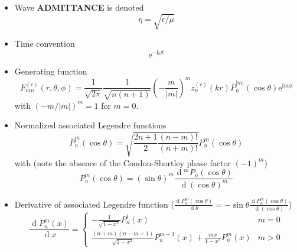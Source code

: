 \documentclass[a4paper,12pt]{article}
\newcommand{\mrm}[1]{\mathrm{#1}}
\newcommand{\diff}{\operatorname{d}\!}
\newcommand{\iu}{\mrm{i}}
\newcommand{\eu}{\mrm{e}}
\begin{document}
\begin{itemize}
\item Wave \textbf{ADMITTANCE} is denoted
  \begin{equation}
    \eta = \sqrt{\epsilon/\mu}
  \end{equation}
\item Time convention
  \begin{equation}
    \eu^{-\iu\omega t}
  \end{equation}
\item Generating function
  \begin{equation}
    F_{mn}^{(c)}(r,\theta,\phi) = \frac{1}{\sqrt{2\pi}} \frac{1}{\sqrt{n(n+1)}} \left(-\frac{m}{|m|}\right)^{m} z_{n}^{(c)}(kr) \bar{P}_{n}^{|m|}(\cos\theta) \eu^{\iu m\phi}
  \end{equation}
  with $(-m/|m|)^{m} = 1$ for $m=0$.
\item Normalized associated Legendre functions
  \begin{equation}
    \bar{P}_{n}^{m}(\cos\theta) = \sqrt{\frac{2n+1}{2}\frac{(n-m)!}{(n+m)!}} P_{n}^{m}(\cos\theta)
  \end{equation}
  with (note the absence of the Condon-Shortley phase factor $(-1)^{m}$)
  \begin{equation}
    P_{n}^{m}(\cos\theta) = (\sin\theta)^{m}\frac{\diff^{m}P_{n}(\cos\theta)}{\diff(\cos\theta)^{m}}
  \end{equation}
\item Derivative of associated Legendre function ($\frac{\diff P_{n}^{m}(\cos\theta)}{\diff\theta} = -\sin\theta\frac{\diff P_{n}^{m}(\cos\theta)}{\diff(\cos\theta)}$)
  \begin{equation}
    \frac{\diff P_{n}^{m}(x)}{\diff x} =
    \begin{cases}
      -\frac{1}{\sqrt{1-x^{2}}}P_{n}^{1}(x) & m=0 \\
      \frac{(n + m)(n - m + 1)}{\sqrt{1 - x^{2}}} P_{n}^{m-1}(x) + \frac{mx}{1-x^{2}}P_{n}^{m}(x) & m >0
    \end{cases}
  \end{equation}

\end{itemize}
\end{document}
